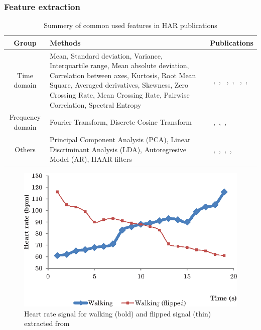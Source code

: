 \subsubsection{Feature extraction}
\begin{table}[h]
    \centering
\begin{tabular}{|c|>{\centering}m{8cm}|>{\centering}m{4cm}|}
\hline 
Group & Methods& Publications\tabularnewline
\hline 
\hline 
Time domain & Mean, Standard deviation, Variance, Interquartile range, Mean absolute deviation, Correlation between axes, Kurtosis, Root Mean Square, Averaged derivatives, Skewness, Zero Crossing Rate, Mean Crossing Rate, Pairwise Correlation, Spectral Entropy & ~\citep{banos2014window},~\citep{morris2014recofit},
~\citep{parkka2006activity},~\citep{tapia2007real},
~\citep{kao2009development},~\citep{maurer2006activity},
~\citep{zhang2011feature} \tabularnewline
\hline 
Frequency domain & Fourier Transform, Discrete  Cosine
Transform &~\citep{bao2004activity},~\citep{morris2014recofit},~\citep{chen2008online},~\citep{altun2010human}\tabularnewline
\hline 
Others & Principal  Component  Analysis (PCA), Linear
Discriminant  Analysis (LDA), Autoregresive  Model
(AR), HAAR filters &~\citep{morris2014recofit},~\citep{altun2010human},~\citep{he2009activity},~\citep{chen2008online},~\citep{hanai2009haar}\tabularnewline
\hline 
\end{tabular}
    \caption{Summery of common used features in HAR publications }
    \label{tab:statistical_features}
\end{table}

\begin{figure}[h]
    \centering
    \includegraphics[width=.9\textwidth]{Figures/walking_heart.png}
    \caption{Heart rate signal for walking (bold) and flipped signal (thin) extracted from~\cite{lara2012survey}}
    \label{fig:walking_heart}
\end{figure}

